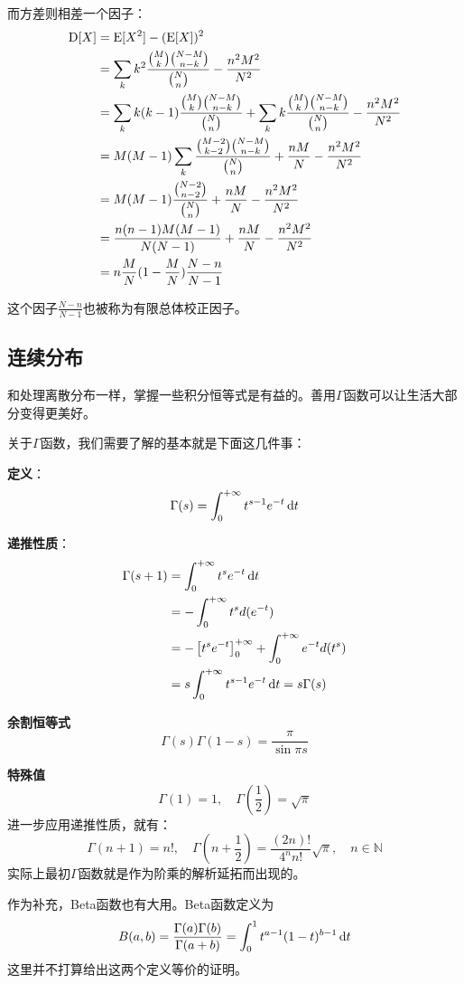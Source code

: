 而方差则相差一个因子：
\begin{align*}
\operatorname{D}[X]&=\operatorname{E}[X^2]-(\operatorname{E}[X])^2\\
&=\sum_{k}k^2\frac{\binom{M}{k}\binom{N-M}{n-k}}{\binom{N}{n}}-\frac {n^2M^2}{N^2}\\
&=\sum_{k}k(k-1)\frac{\binom{M}{k}\binom{N-M}{n-k}}{\binom{N}{n}}+\sum_{k}k\frac{\binom{M}{k}\binom{N-M}{n-k}}{\binom{N}{n}}-\frac {n^2M^2}{N^2}\\
&=M(M-1)\sum_{k}\frac{\binom{M-2}{k-2}\binom{N-M}{n-k}}{\binom{N}{n}} + \frac{nM}{N} -\frac {n^2M^2}{N^2}\\
&=M(M-1)\frac{\binom{N-2}{n-2}}{\binom{N}{n}} + \frac{nM}{N} -\frac {n^2M^2}{N^2}\\
&=\frac{n(n-1)M(M-1)}{N(N-1)} + \frac{nM}{N} -\frac {n^2M^2}{N^2}\\
&= n\frac{M}{N}(1-\frac MN)\frac{N-n}{N-1}
\end{align*}

这个因子$\frac{N-n}{N-1}$也被称为有限总体校正因子。

\subsection{连续分布}

和处理离散分布一样，掌握一些积分恒等式是有益的。善用$\Gamma$函数可以让生活大部分变得更美好。

关于$\Gamma$函数，我们需要了解的基本就是下面这几件事：

\textbf{定义}：
\[
\Gamma(s) = \int_0^{+\infty}t^{s-1}e^{-t}\mathop{}\!\mathrm{d} t
\]

\textbf{递推性质}：
\begin{align*}
\Gamma(s+1) &= \int_0^{+\infty}t^{s}e^{-t}\mathop{}\!\mathrm{d} t\\
&= -\int_0^{+\infty}t^{s}d(e^{-t})\\
&= -\left[t^se^{-t}\right]_{0}^{+\infty} +\int_0^{+\infty}e^{-t}d(t^{s})\\
&= s\int_0^{+\infty}t^{s-1}e^{-t}\mathop{}\!\mathrm{d} t = s\Gamma(s)\\
\end{align*}

\textbf{余割恒等式}
\[
\Gamma(s)\Gamma(1-s)=\frac{\pi}{\sin{\pi s}}
\]

\textbf{特殊值}
\[
\Gamma(1)=1,\quad \Gamma(\frac12)=\sqrt{\pi}
\]
进一步应用递推性质，就有：
\[
\Gamma(n+1)=n!,\quad \Gamma\left(n+\frac12\right)=\frac{(2n)!}{4^n n!}\sqrt{\pi},\quad n\in\mathbb{N}
\]
实际上最初$\Gamma$函数就是作为阶乘的解析延拓而出现的。

作为补充，Beta函数也有大用。Beta函数定义为
\[
B(a,b)=\frac{\Gamma(a)\Gamma(b)}{\Gamma(a+b)} = \int_0^1 t^{a-1}(1-t)^{b-1}\mathop{}\!\mathrm{d} t
\]
这里并不打算给出这两个定义等价的证明。

